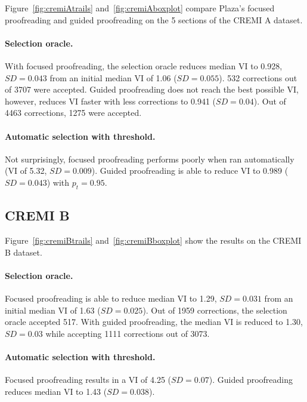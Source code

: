 Figure~\ref{fig:cremiAtrails} and~\ref{fig:cremiAboxplot} compare Plaza's focused proofreading and guided proofreading on the 5 sections of the CREMI A dataset.

\paragraph{Selection oracle.} With focused proofreading, the selection oracle reduces median VI to 0.928, $SD=0.043$ from an initial median VI of 1.06 ($SD=0.055$). 532 corrections out of 3707 were accepted. Guided proofreading does not reach the best possible VI, however, reduces VI faster with less corrections to 0.941 ($SD=0.04$). Out of 4463 corrections, 1275 were accepted.

\paragraph{Automatic selection with threshold.} Not surprisingly, focused proofreading performs poorly when ran automatically (VI of 5.32, $SD=0.009$). Guided proofreading is able to reduce VI to 0.989 ($SD=0.043$) with $p_t=0.95$.

\subsection{CREMI B}

Figure~\ref{fig:cremiBtrails} and~\ref{fig:cremiBboxplot} show the results on the CREMI B dataset.

\paragraph{Selection oracle.} Focused proofreading is able to reduce median VI to 1.29, $SD=0.031$ from an initial median VI of 1.63 ($SD=0.025$). Out of 1959 corrections, the selection oracle accepted 517. With guided proofreading, the median VI is reduced to 1.30, $SD=0.03$ while accepting 1111 corrections out of 3073.

\paragraph{Automatic selection with threshold.} Focused proofreading results in a VI of 4.25 ($SD=0.07$). Guided proofreading reduces median VI to 1.43 ($SD=0.038$).

